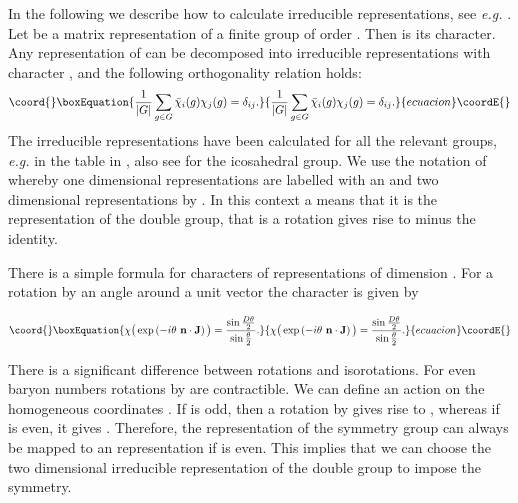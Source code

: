 \documentclass[a4paper,12pt]{article}
\begin{document}
In the following we describe how to calculate irreducible 
representations, see {\it e.g.} \cite{Hamermesh:1962}.
Let \coordHE{}  be a matrix representation of a finite group \coordHE{} of order 
\coordHE{}. Then \coordHE{} is its character. Any 
representation of \coordHE{} can be decomposed into irreducible representations 
with character \coordHE{}, and the following orthogonality relation holds:
%
\begin{equation}\coord{}\boxEquation{
\frac{1}{|G|} \sum\limits_{g \in G} {\bar \chi}_i(g) \chi_j(g) = \delta_{ij}.
}{
\frac{1}{|G|} \sum\limits_{g \in G} {\bar \chi}_i(g) \chi_j(g) = \delta_{ij}.
}{ecuacion}\coordE{}\end{equation}
%
The irreducible representations have been calculated for all the relevant 
groups, {\it e.g.} in the table in \cite{Koster:1963}, also see 
\cite{Dresselhaus:1996} for the icosahedral group. We use the notation 
of \cite{Hamermesh:1962} whereby one dimensional representations are labelled 
with an \coordHE{} and two dimensional representations by \coordHE{}. In this context a 
\myHighlight{${}^\prime$}\coordHE{} means that it is the representation of the double group, that is a 
\myHighlight{$2 \pi$}\coordHE{} rotation gives rise to minus the identity. 

There is a simple formula for characters of \coordHE{} representations of 
dimension \coordHE{}. For a rotation by an angle \myHighlight{$\theta$}\coordHE{} around a unit vector 
\coordHE{} the character is given by

\begin{equation}\coord{}\boxEquation{
\label{character}
\chi\big( \exp \left( -i \theta\ {\bf n} \cdot {\bf J} \right) \big) 
= \frac{\sin \frac{D \theta}{2}}{\sin \frac{\theta}{2}}.
}{
\chi\big( \exp \left( -i \theta\ {\bf n} \cdot {\bf J} \right) \big) 
= \frac{\sin \frac{D \theta}{2}}{\sin \frac{\theta}{2}}.
}{ecuacion}\coordE{}\end{equation}

There is a significant difference between rotations and isorotations. For 
even baryon numbers \coordHE{} rotations by \myHighlight{$2 \pi$}\coordHE{} are contractible. 
We can define an \coordHE{} action on the homogeneous coordinates \myHighlight{$[p,q]$}\coordHE{}. 
If \coordHE{} is odd, then a rotation by \myHighlight{$2 \pi$}\coordHE{} 
gives rise to \myHighlight{$[-p,-q]$}\coordHE{}, whereas if \coordHE{} is even, it gives \myHighlight{$[p,q]$}\coordHE{}. 
Therefore, the \coordHE{} representation of the symmetry group can 
always be mapped to an \coordHE{} representation if \coordHE{} is even.
This implies that we can choose the two dimensional 
irreducible representation \coordHE{} of the double group to impose 
the symmetry.
\end{document}

